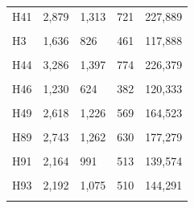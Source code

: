 \documentclass[
  a4paper,
  titlepage]{article}
\begin{document}
\begin{longtable}[t]{lllll}
H41 & 2,879 & 1,313 & 721 & 227,889\\
 
\cellcolor{gray!6}{H42} & \cellcolor{gray!6}{3,311} & \cellcolor{gray!6}{1,495} & \cellcolor{gray!6}{745} & \cellcolor{gray!6}{220,048}\\
 
H3 & 1,636 & 826 & 461 & 117,888\\
 
\cellcolor{gray!6}{H43} & \cellcolor{gray!6}{2,767} & \cellcolor{gray!6}{1,309} & \cellcolor{gray!6}{612} & \cellcolor{gray!6}{160,622}\\
 
H44 & 3,286 & 1,397 & 774 & 226,379\\
 
\cellcolor{gray!6}{H45} & \cellcolor{gray!6}{2,948} & \cellcolor{gray!6}{1,426} & \cellcolor{gray!6}{675} & \cellcolor{gray!6}{193,699}\\
 
H46 & 1,230 & 624 & 382 & 120,333\\
 
\cellcolor{gray!6}{H47} & \cellcolor{gray!6}{2,376} & \cellcolor{gray!6}{1,123} & \cellcolor{gray!6}{609} & \cellcolor{gray!6}{159,596}\\
 
H49 & 2,618 & 1,226 & 569 & 164,523\\
 
\cellcolor{gray!6}{H87} & \cellcolor{gray!6}{3,137} & \cellcolor{gray!6}{1,407} & \cellcolor{gray!6}{706} & \cellcolor{gray!6}{182,641}\\
 
H89 & 2,743 & 1,262 & 630 & 177,279\\
 
\cellcolor{gray!6}{H8} & \cellcolor{gray!6}{1,653} & \cellcolor{gray!6}{739} & \cellcolor{gray!6}{489} & \cellcolor{gray!6}{140,395}\\
 
H91 & 2,164 & 991 & 513 & 139,574\\
 
\cellcolor{gray!6}{H92} & \cellcolor{gray!6}{1,642} & \cellcolor{gray!6}{790} & \cellcolor{gray!6}{561} & \cellcolor{gray!6}{172,702}\\
 
H93 & 2,192 & 1,075 & 510 & 144,291\\
 
\cellcolor{gray!6}{H94} & \cellcolor{gray!6}{3,787} & \cellcolor{gray!6}{1,709} & \cellcolor{gray!6}{872} & \cellcolor{gray!6}{216,991}\\
 

\end{longtable}
\end{document}
